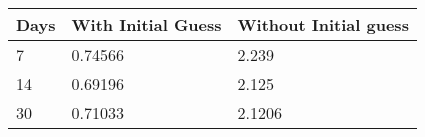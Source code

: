 \begin{tabular}{lll}
Days & With Initial Guess & Without Initial guess \\ 
\hline 
7 & 0.74566 & 2.239 \\ 
14 & 0.69196 & 2.125 \\ 
30 & 0.71033 & 2.1206 \\ 
\hline 
\end{tabular}